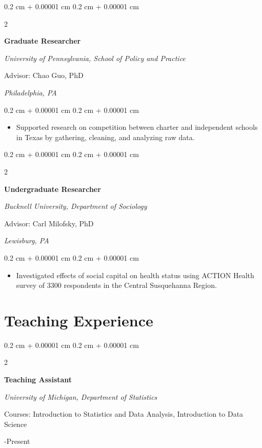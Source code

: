 \documentclass[11pt, letterpaper]{article}
\newenvironment{highlights}{
    \begin{itemize}[
        topsep=0.10 cm,
        parsep=0.10 cm,
        partopsep=0pt,
        itemsep=0pt,
        leftmargin=0.4 cm + 10pt
    ]
}{
    \end{itemize}
} %
\newenvironment{onecolentry}{
    \begin{adjustwidth}{
        0.2 cm + 0.00001 cm
    }{
        0.2 cm + 0.00001 cm
    }
}{
    \end{adjustwidth}
} %
\newenvironment{twocolentry}[2][]{
    \onecolentry
    \def\secondColumn{#2}
    \setcolumnwidth{\fill, 4.5 cm}
    \begin{paracol}{2}
}{
    \switchcolumn \raggedleft \secondColumn
    \end{paracol}
    \endonecolentry
} %
\begin{document}
\vspace{0.2cm}

\begin{twocolentry}{2014
    
    \textit{Philadelphia, PA}
    }
    \textbf{Graduate Researcher}

    \textit{University of Pennsylvania, School of Policy and Practice}

    Advisor: Chao Guo, PhD
\end{twocolentry}

\vspace{0.05 cm}
\begin{onecolentry}
    \begin{highlights}
        \item Supported research on competition between charter and independent schools in Texas by gathering, cleaning, and analyzing raw data.
    \end{highlights}
\end{onecolentry}


\vspace{0.2cm}

\pagebreak
\begin{twocolentry}{2013

    \textit{Lewisburg, PA}
    }
    \textbf{Undergraduate Researcher}

    \textit{Bucknell University, Department of Sociology}

    Advisor: Carl Milofsky, PhD
\end{twocolentry}

\vspace{0.05 cm}
\begin{onecolentry}
    \begin{highlights}
        \item  Investigated eﬀects of social capital on health status using ACTION Health
        survey of 3300 respondents in the Central Susquehanna Region.
    \end{highlights}
\end{onecolentry}

\section{Teaching Experience}

\begin{twocolentry}{2024-Present}
    \textbf{Teaching Assistant}

    \textit{University of Michigan, Department of Statistics}

    Courses: Introduction to Statistics and Data Analysis, Introduction to Data Science


\end{twocolentry}
\end{document}
